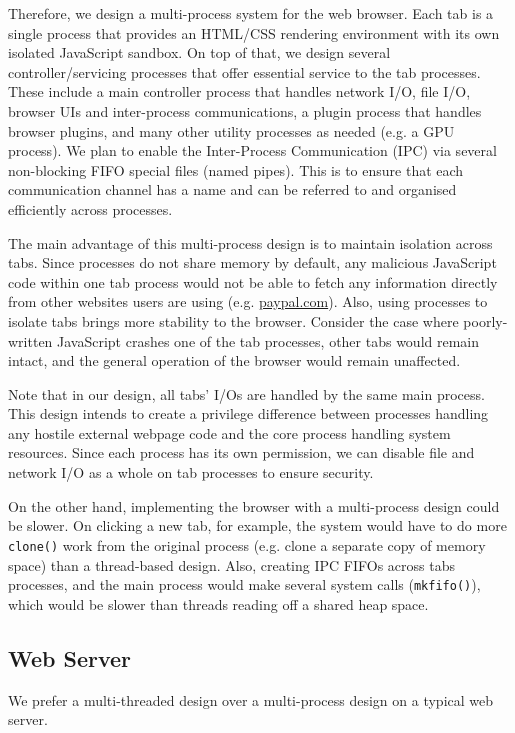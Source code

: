 \documentclass[12pt]{article}
\begin{document}
Therefore, we design a multi-process system for the web browser. Each tab is a single process that provides an HTML/CSS rendering environment with its own isolated JavaScript sandbox. On top of that, we design several controller/servicing processes that offer essential service to the tab processes. These include a main controller process that handles network I/O, file I/O, browser UIs and inter-process communications, a plugin process that handles browser plugins, and many other utility processes as needed (e.g. a GPU process). We plan to enable the Inter-Process Communication (IPC) via several non-blocking FIFO special files (named pipes). This is to ensure that each communication channel has a name and can be referred to and organised efficiently across processes.

The main advantage of this multi-process design is to maintain isolation across tabs. Since processes do not share memory by default, any malicious JavaScript code within one tab process would not be able to fetch any information directly from other websites users are using (e.g. \url{paypal.com}). Also, using processes to isolate tabs brings more stability to the browser. Consider the case where poorly-written JavaScript crashes one of the tab processes, other tabs would remain intact, and the general operation of the browser would remain unaffected. 

Note that in our design, all tabs' I/Os are handled by the same main process. This design intends to create a privilege difference between processes handling any hostile external webpage code and the core process handling system resources. Since each process has its own permission, we can disable file and network I/O as a whole on tab processes to ensure security.

On the other hand, implementing the browser with a multi-process design could be slower. On clicking a new tab, for example, the system would have to do more \texttt{clone()} work from the original process (e.g. clone a separate copy of memory space) than a thread-based design. Also, 
creating IPC FIFOs across tabs processes, and the main process would make several system calls (\texttt{mkfifo()}), which would be slower than threads reading off a shared heap space.

\subsection{Web Server}
We prefer a multi-threaded design over a multi-process design on a typical web server.
\end{document}
